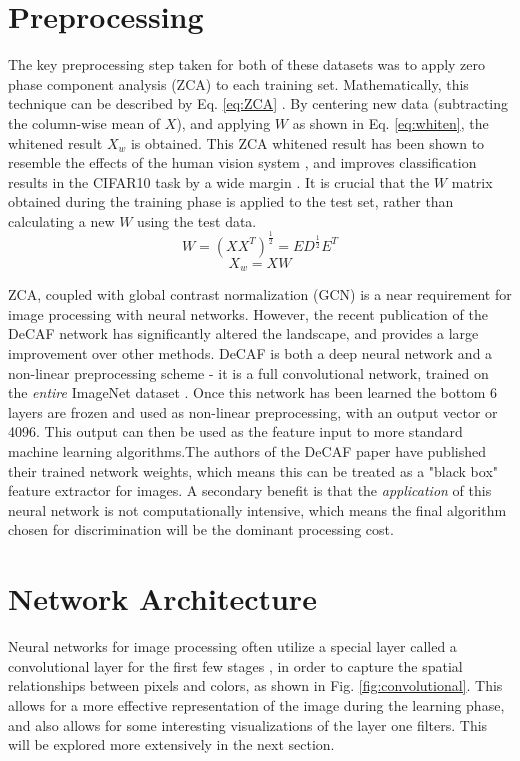 \documentclass[journal]{IEEEtran}
\begin{document}
\section{Preprocessing}
The key preprocessing step taken for both of these datasets was to apply zero
phase component analysis (ZCA) to each training set. Mathematically, this 
technique can be described by Eq. \ref{eq:ZCA} \cite{CIFAR10}. By centering 
new data (subtracting the column-wise mean of $X$), and applying $W$ as shown in 
Eq. \ref{eq:whiten}, the whitened result $X_w$ is obtained. This ZCA 
whitened result has been shown to resemble the effects of the human vision
system \cite{ZCA}, and improves classification results in the CIFAR10 task 
by a wide margin \cite{CIFAR10}. It is crucial that the $W$ matrix obtained 
during the training phase is applied to the test set, rather than calculating
a new $W$ using the test data.
\begin{equation}
W = (XX^T)^{\frac{1}{2}} = ED^{\frac{1}{2}}E^T
\label{eq:ZCA}
\end{equation}
\begin{equation}
X_w = XW
\label{eq:whiten}
\end{equation}


ZCA, coupled with global contrast normalization (GCN) is a near requirement for 
image processing with neural networks. However, the recent publication of the 
DeCAF network \cite{DeCAF} has significantly altered the landscape, and
provides a large improvement over other methods. DeCAF is both a deep neural
network and a non-linear preprocessing scheme - it is a full convolutional 
network, trained on the \emph{entire} ImageNet dataset \cite{TorontoImageNet}.
Once this network has been learned the bottom 6 layers are frozen and used as
non-linear preprocessing, with an output vector or 4096. This output can then 
be used as the feature input to more standard machine learning algorithms.The
authors of the DeCAF paper have published their trained network weights, which
means this can be treated as a "black box" feature extractor for images. A 
secondary benefit is that the \emph{application} of this neural network is not
computationally intensive, which means the final algorithm chosen for
discrimination will be the dominant processing cost.

\section{Network Architecture}
Neural networks for image processing often utilize a special layer called a
convolutional layer for the first few stages \cite{Convolutional}, in order 
to capture the spatial relationships between pixels and colors, as shown in 
Fig. \ref{fig:convolutional}. This allows for a more effective representation
of the image during the learning phase, and also allows for some interesting
visualizations of the layer one filters. This will be explored more extensively
in the next section.
\end{document}
